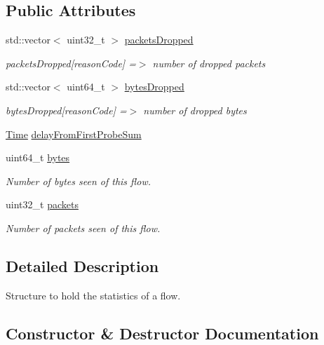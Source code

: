 \subsection*{Public Attributes}
\begin{DoxyCompactItemize}
\item 
std\+::vector$<$ uint32\+\_\+t $>$ \hyperlink{structns3_1_1FlowProbe_1_1FlowStats_a633e71ffc04d3d8fee7f2f2d35359260}{packets\+Dropped}
\begin{DoxyCompactList}\small\item\em packets\+Dropped\mbox{[}reason\+Code\mbox{]} =$>$ number of dropped packets \end{DoxyCompactList}\item 
std\+::vector$<$ uint64\+\_\+t $>$ \hyperlink{structns3_1_1FlowProbe_1_1FlowStats_ac8cb4a1fbbf839b3d9dae9ba4385809b}{bytes\+Dropped}
\begin{DoxyCompactList}\small\item\em bytes\+Dropped\mbox{[}reason\+Code\mbox{]} =$>$ number of dropped bytes \end{DoxyCompactList}\item 
\hyperlink{classns3_1_1Time}{Time} \hyperlink{structns3_1_1FlowProbe_1_1FlowStats_a4c3473f9a1865006664b82d49f1fb634}{delay\+From\+First\+Probe\+Sum}
\item 
uint64\+\_\+t \hyperlink{structns3_1_1FlowProbe_1_1FlowStats_a3def23a54ccb2e51a0cf6b3209a1faf6}{bytes}
\begin{DoxyCompactList}\small\item\em Number of bytes seen of this flow. \end{DoxyCompactList}\item 
uint32\+\_\+t \hyperlink{structns3_1_1FlowProbe_1_1FlowStats_a45e424acdfef98e8c1919f362e1c2645}{packets}
\begin{DoxyCompactList}\small\item\em Number of packets seen of this flow. \end{DoxyCompactList}\end{DoxyCompactItemize}


\subsection{Detailed Description}
Structure to hold the statistics of a flow. 

\subsection{Constructor \& Destructor Documentation}
